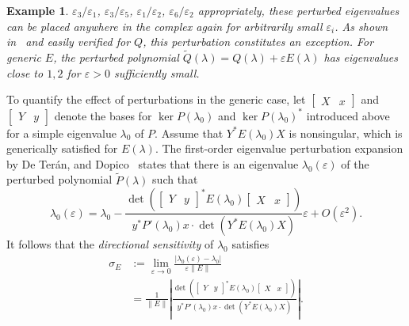 \documentclass[12pt]{article}
\newtheorem{example}[theorem]{Example}
\begin{document}
\begin{example}
    $\varepsilon_3/\varepsilon_1$, $\varepsilon_3/\varepsilon_5$, $\varepsilon_1/\varepsilon_2$, $\varepsilon_6/\varepsilon_2$ appropriately, these perturbed eigenvalues can be placed anywhere in the complex again for arbitrarily small $\varepsilon_i$. As shown in~\cite{de2010first} and easily verified for $Q$, this perturbation constitutes an exception. For generic $E$, the perturbed polynomial $\tilde Q(\lambda) = Q(\lambda) + \varepsilon E(\lambda)$ has eigenvalues close to $1,2$ for $\varepsilon>0$ sufficiently small.
\end{example}

To quantify the effect of perturbations in the generic case, let $\begin{bmatrix}
    X & x
\end{bmatrix}$ and $\begin{bmatrix}
    Y & y
\end{bmatrix}$ denote the bases for $\ker P(\lambda_0)$ and $\ker P(\lambda_0)^*$ introduced above for a simple eigenvalue $\lambda_0$ of $P$. Assume that $Y^*E(\lambda_0) X$ is nonsingular, which is generically satisfied for $E(\lambda)$. The first-order eigenvalue perturbation expansion by De Ter\'an, and Dopico~\cite{de2010first} states that there is an eigenvalue $\lambda_0(\varepsilon)$ of the perturbed polynomial $\tilde{P}(\lambda)$ such that
\begin{equation}\label{eq:Expansion}
    \lambda_0(\varepsilon) = \lambda_0 - \frac{\det (\begin{bmatrix} Y & y \end{bmatrix}^*E(\lambda_0)\begin{bmatrix} X & x \end{bmatrix})}{y^*P'(\lambda_0)x\cdot \det(Y^*E(\lambda_0)X)}\varepsilon + O(\varepsilon^2).
\end{equation}
It follows that the \emph{directional sensitivity} of $\lambda_0$ satisfies
\begin{align}
    \sigma_E &:= \lim_{\varepsilon\to 0}\frac{|\lambda_0(\varepsilon) - \lambda_0|}{\varepsilon \|E\|} \nonumber  \\
    &= \frac{1}{\|E\|}\left| \frac{\det (\begin{bmatrix} Y & y \end{bmatrix}^*E(\lambda_0)\begin{bmatrix} X & x \end{bmatrix})}{y^*P'(\lambda_0)x\cdot \det(Y^*E(\lambda_0)X)} \right|. \label{sigmaEformula}
\end{align}
\end{document}
